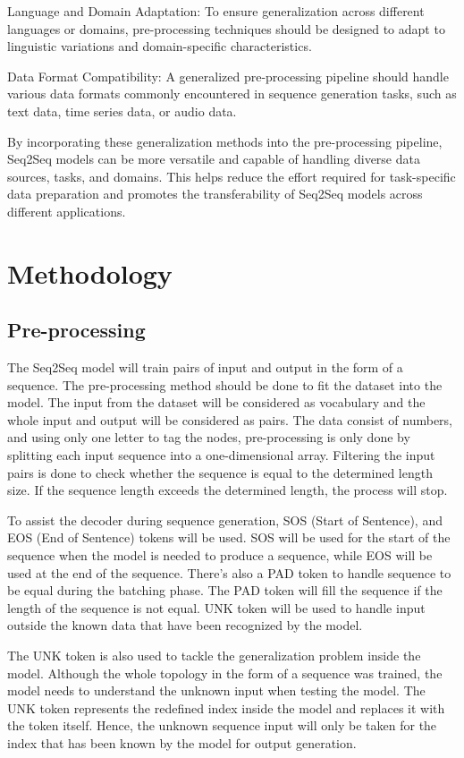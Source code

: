 \documentclass[conference]{IEEEtran}
\begin{document}
    Language and Domain Adaptation: To ensure generalization across different languages or domains, pre-processing techniques should be designed to adapt to linguistic variations and domain-specific characteristics.

    Data Format Compatibility: A generalized pre-processing pipeline should handle various data formats commonly encountered in sequence generation tasks, such as text data, time series data, or audio data.

By incorporating these generalization methods into the pre-processing pipeline, Seq2Seq models can be more versatile and capable of handling diverse data sources, tasks, and domains. This helps reduce the effort required for task-specific data preparation and promotes the transferability of Seq2Seq models across different applications.


\section{Methodology}

\subsection{Pre-processing}

The Seq2Seq model will train pairs of input and output in the form of a sequence. The pre-processing method should be done to fit the dataset into the model. The input from the dataset will be considered as vocabulary and the whole input and output will be considered as pairs. The data consist of numbers, and using only one letter to tag the nodes, pre-processing is only done by splitting each input sequence into a one-dimensional array. Filtering the input pairs is done to check whether the sequence is equal to the determined length size. If the sequence length exceeds the determined length, the process will stop.

To assist the decoder during sequence generation, SOS (Start of Sentence), and EOS (End of Sentence) tokens will be used. SOS will be used for the start of the sequence when the model is needed to produce a sequence, while EOS will be used at the end of the sequence. There's also a PAD token to handle sequence to be equal during the batching phase. The PAD token will fill the sequence if the length of the sequence is not equal. UNK token will be used to handle input outside the known data that have been recognized by the model.

The UNK token is also used to tackle the generalization problem inside the model. Although the whole topology in the form of a sequence was trained, the model needs to understand the unknown input when testing the model. The UNK token represents the redefined index inside the model and replaces it with the token itself. Hence, the unknown sequence input will only be taken for the index that has been known by the model for output generation.
\end{document}
